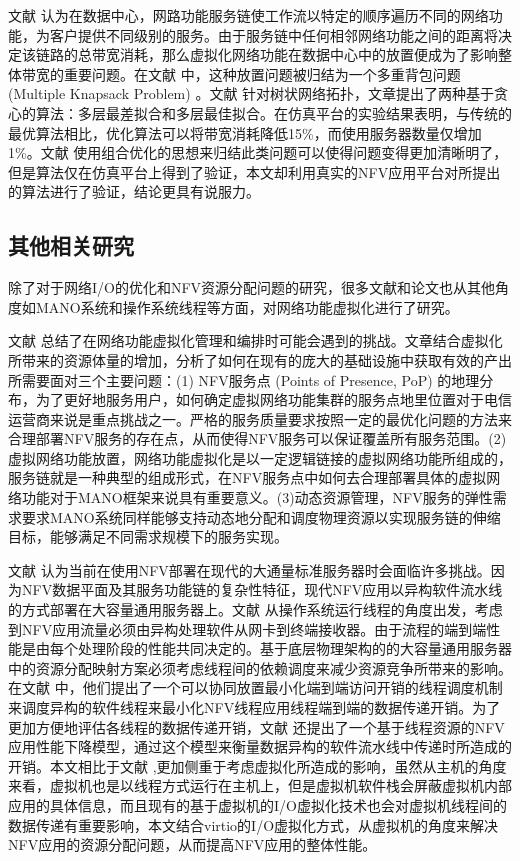 文献  认为在数据中心，网路功能服务链使工作流以特定的顺序遍历不同的网络功能，为客户提供不同级别的服务。由于服务链中任何相邻网络功能之间的距离将决定该链路的总带宽消耗，那么虚拟化网络功能在数据中心中的放置便成为了影响整体带宽的重要问题。在文献  中，这种放置问题被归结为一个多重背包问题 (Multiple Knapsack Problem) 。文献  针对树状网络拓扑，文章提出了两种基于贪心的算法：多层最差拟合和多层最佳拟合。在仿真平台的实验结果表明，与传统的最优算法相比，优化算法可以将带宽消耗降低15\%，而使用服务器数量仅增加1\%。文献  使用组合优化的思想来归结此类问题可以使得问题变得更加清晰明了，但是算法仅在仿真平台上得到了验证，本文却利用真实的NFV应用平台对所提出的算法进行了验证，结论更具有说服力。


\subsection{其他相关研究}
除了对于网络I/O的优化和NFV资源分配问题的研究，很多文献和论文也从其他角度如MANO系统和操作系统线程等方面，对网络功能虚拟化进行了研究。

文献  总结了在网络功能虚拟化管理和编排时可能会遇到的挑战。文章结合虚拟化所带来的资源体量的增加，分析了如何在现有的庞大的基础设施中获取有效的产出所需要面对三个主要问题：(1) NFV服务点 (Points of Presence, PoP) 的地理分布，为了更好地服务用户，如何确定虚拟网络功能集群的服务点地里位置对于电信运营商来说是重点挑战之一。严格的服务质量要求按照一定的最优化问题的方法来合理部署NFV服务的存在点，从而使得NFV服务可以保证覆盖所有服务范围。(2)虚拟网络功能放置，网络功能虚拟化是以一定逻辑链接的虚拟网络功能所组成的，服务链就是一种典型的组成形式，在NFV服务点中如何去合理部署具体的虚拟网络功能对于MANO框架来说具有重要意义。(3)动态资源管理，NFV服务的弹性需求要求MANO系统同样能够支持动态地分配和调度物理资源以实现服务链的伸缩目标，能够满足不同需求规模下的服务实现。

文献  认为当前在使用NFV部署在现代的大通量标准服务器时会面临许多挑战。因为NFV数据平面及其服务功能链的复杂性特征，现代NFV应用以异构软件流水线的方式部署在大容量通用服务器上。文献  从操作系统运行线程的角度出发，考虑到NFV应用流量必须由异构处理软件从网卡到终端接收器。由于流程的端到端性能是由每个处理阶段的性能共同决定的。基于底层物理架构的的大容量通用服务器中的资源分配映射方案必须考虑线程间的依赖调度来减少资源竞争所带来的影响。在文献  中，他们提出了一个可以协同放置最小化端到端访问开销的线程调度机制来调度异构的软件线程来最小化NFV线程应用线程端到端的数据传递开销。为了更加方便地评估各线程的数据传递开销，文献  还提出了一个基于线程资源的NFV应用性能下降模型，通过这个模型来衡量数据异构的软件流水线中传递时所造成的开销。本文相比于文献  ,更加侧重于考虑虚拟化所造成的影响，虽然从主机的角度来看，虚拟机也是以线程方式运行在主机上，但是虚拟机软件栈会屏蔽虚拟机内部应用的具体信息，而且现有的基于虚拟机的I/O虚拟化技术也会对虚拟机线程间的数据传递有重要影响，本文结合virtio的I/O虚拟化方式，从虚拟机的角度来解决NFV应用的资源分配问题，从而提高NFV应用的整体性能。

